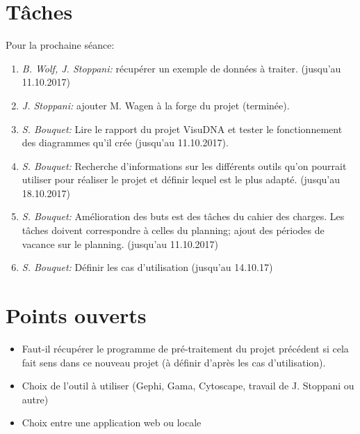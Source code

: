 \documentclass{article}
\newcommand{\hmwkAuthorName}{S. Bouquet} %
\begin{document}
\section{Tâches}
Pour la prochaine séance:
\begin{enumerate}
  \item \textit{B. Wolf, J. Stoppani:} récupérer un exemple de données à traiter. (jusqu'au 11.10.2017)
  \item \textit{J. Stoppani:} ajouter M. Wagen à la forge du projet (terminée).
  \item \textit{\hmwkAuthorName:} Lire le rapport du projet VisuDNA et tester le fonctionnement des diagrammes qu'il crée (jusqu'au 11.10.2017).
  \item \textit{\hmwkAuthorName:} Recherche d'informations sur les différents outils qu'on pourrait utiliser pour réaliser le projet et définir lequel est le plus adapté. (jusqu'au 18.10.2017)
  \item \textit{\hmwkAuthorName:} Amélioration des buts est des tâches du cahier des charges. Les tâches doivent correspondre à celles du planning; ajout des périodes de vacance sur le planning. (jusqu'au 11.10.2017)
  \item \textit{\hmwkAuthorName:} Définir les cas d'utilisation (jusqu'au 14.10.17)
\end{enumerate}

\section{Points ouverts}
\begin{itemize}
  \item Faut-il récupérer le programme de pré-traitement du projet précédent si cela fait sens dans ce nouveau projet (à définir d'après les cas d'utilisation).
  \item Choix de l'outil à utiliser (Gephi, Gama, Cytoscape, travail de J. Stoppani ou autre)
  \item Choix entre une application web ou locale
\end{itemize}


\begingroup
  \renewcommand{\section}[2]{}
  
  
  \nocite{*}
\endgroup
\end{document}

